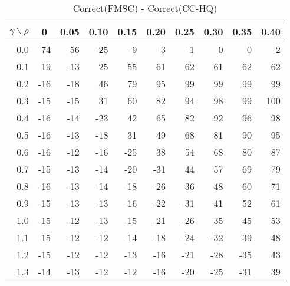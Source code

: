 \documentclass[12pt]{article}
\begin{document}
\begin{table}[!tbp]
\caption{Correct(FMSC) - Correct(CC-HQ)}
 \begin{center}
 \begin{tabular}{r|rrrrrrrrr}\hline\hline
\multicolumn{1}{c|}{$\gamma\backslash\rho$}&\multicolumn{1}{c}{0}&\multicolumn{1}{c}{0.05}&\multicolumn{1}{c}{0.10}&\multicolumn{1}{c}{0.15}&\multicolumn{1}{c}{0.20}&\multicolumn{1}{c}{0.25}&\multicolumn{1}{c}{0.30}&\multicolumn{1}{c}{0.35}&\multicolumn{1}{c}{0.40}\tabularnewline
\hline


0.0& 74& 56&-25& -9& -3& -1&  0&  0&  2\tabularnewline
0.1& 19&-13& 25& 55& 61& 62& 61& 62& 62\tabularnewline
0.2&-16&-18& 46& 79& 95& 99& 99& 99& 99\tabularnewline
0.3&-15&-15& 31& 60& 82& 94& 98& 99&100\tabularnewline
0.4&-16&-14&-23& 42& 65& 82& 92& 96& 98\tabularnewline
0.5&-16&-13&-18& 31& 49& 68& 81& 90& 95\tabularnewline
0.6&-16&-12&-16&-25& 38& 54& 68& 80& 87\tabularnewline
0.7&-15&-13&-14&-20&-31& 44& 57& 69& 79\tabularnewline
0.8&-16&-13&-14&-18&-26& 36& 48& 60& 71\tabularnewline
0.9&-15&-13&-13&-16&-22&-31& 41& 52& 61\tabularnewline
1.0&-15&-12&-13&-15&-21&-26& 35& 45& 53\tabularnewline
1.1&-15&-12&-12&-14&-18&-24&-32& 39& 48\tabularnewline
1.2&-15&-12&-12&-13&-16&-21&-28&-35& 43\tabularnewline
1.3&-14&-13&-12&-12&-16&-20&-25&-31& 39\tabularnewline
\hline
\end{tabular}

\end{center}

\end{table}

%
\end{document}
